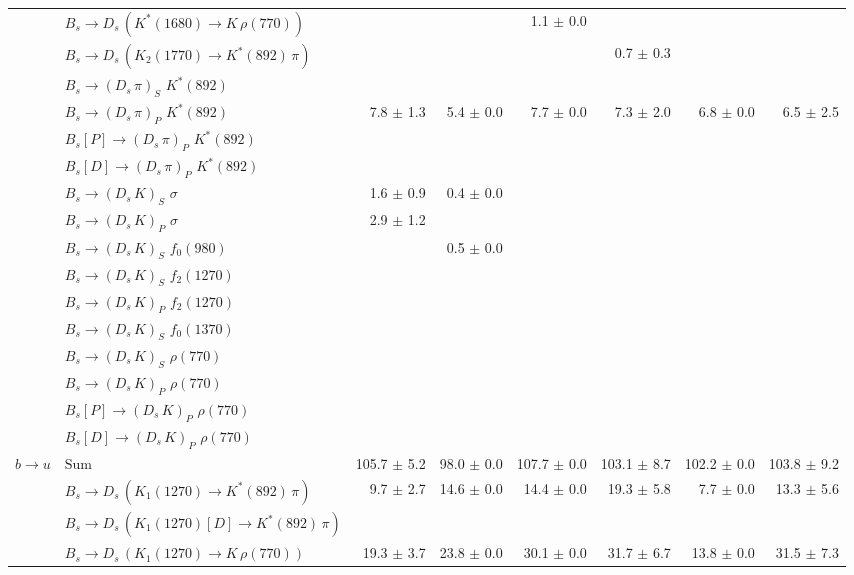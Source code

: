 \begin{tabular}{l l  r  r  r  r  r  r  }
 & $B_s \to D_s \, ( K^{*}(1680) \to K \, \rho(770) )$ &  &  & 1.1 $\pm$ 0.0 &  &  &  \\ 
 & $B_s \to D_s \, ( K_2(1770) \to K^{*}(892) \, \pi )$ &  &  &  & 0.7 $\pm$ 0.3 &  &  \\ 
 & $B_s \to ( D_s \, \pi)_{S} \, \, K^{*}(892)$ &  &  &  &  &  &  \\ 
 & $B_s \to ( D_s \, \pi)_{P} \, \, K^{*}(892)$ & 7.8 $\pm$ 1.3 & 5.4 $\pm$ 0.0 & 7.7 $\pm$ 0.0 & 7.3 $\pm$ 2.0 & 6.8 $\pm$ 0.0 & 6.5 $\pm$ 2.5 \\ 
 & $B_s[P] \to ( D_s \, \pi)_{P} \, \, K^{*}(892)$ &  &  &  &  &  &  \\ 
 & $B_s[D] \to ( D_s \, \pi)_{P} \, \, K^{*}(892)$ &  &  &  &  &  &  \\ 
 & $B_s \to ( D_s \, K)_{S} \, \, \sigma$ & 1.6 $\pm$ 0.9 & 0.4 $\pm$ 0.0 &  &  &  &  \\ 
 & $B_s \to ( D_s \, K)_{P} \, \, \sigma$ & 2.9 $\pm$ 1.2 &  &  &  &  &  \\ 
 & $B_s \to ( D_s \, K)_{S} \, \, f_0(980)$ &  & 0.5 $\pm$ 0.0 &  &  &  &  \\ 
 & $B_s \to ( D_s \, K)_{S} \, \, f_2(1270)$ &  &  &  &  &  &  \\ 
 & $B_s \to ( D_s \, K)_{P} \, \, f_2(1270)$ &  &  &  &  &  &  \\ 
 & $B_s \to ( D_s \, K)_{S} \, \, f_0(1370)$ &  &  &  &  &  &  \\ 
 & $B_s \to ( D_s \, K)_{S} \, \, \rho(770)$ &  &  &  &  &  &  \\ 
 & $B_s \to ( D_s \, K)_{P} \, \, \rho(770)$ &  &  &  &  &  &  \\ 
 & $B_s[P] \to ( D_s \, K)_{P} \, \, \rho(770)$ &  &  &  &  &  &  \\ 
 & $B_s[D] \to ( D_s \, K)_{P} \, \, \rho(770)$ &  &  &  &  &  &  \\ 
\multirow{32}{*}{$b \to u$}  & $\text{Sum}$ & 105.7 $\pm$ 5.2 & 98.0 $\pm$ 0.0 & 107.7 $\pm$ 0.0 & 103.1 $\pm$ 8.7 & 102.2 $\pm$ 0.0 & 103.8 $\pm$ 9.2 \\ 
\hline
 & $B_s \to D_s \, ( K_1(1270) \to K^{*}(892) \, \pi )$ & 9.7 $\pm$ 2.7 & 14.6 $\pm$ 0.0 & 14.4 $\pm$ 0.0 & 19.3 $\pm$ 5.8 & 7.7 $\pm$ 0.0 & 13.3 $\pm$ 5.6 \\ 
 & $B_s \to D_s \, ( K_1(1270)[D] \to K^{*}(892) \, \pi )$ &  &  &  &  &  &  \\ 
 & $B_s \to D_s \, ( K_1(1270) \to K \, \rho(770) )$ & 19.3 $\pm$ 3.7 & 23.8 $\pm$ 0.0 & 30.1 $\pm$ 0.0 & 31.7 $\pm$ 6.7 & 13.8 $\pm$ 0.0 & 31.5 $\pm$ 7.3 \\ 

\end{tabular}
